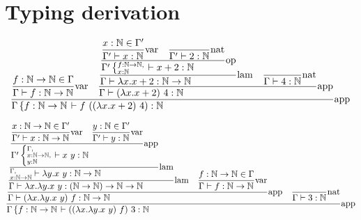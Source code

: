\documentclass{article}
\newcommand{\st}[3][]{\ensuremath{\displaystyle\frac{#3\hfill}{#2\hfill} \text{#1}}}
\newcommand{\N}{\ensuremath \mathbb N}
\newcommand{\lam}[2]{\ensuremath{\lambda#1.#2}}
\begin{document}
\section{Typing derivation}
\begin{equation*}
    \st[app]{
        \Gamma\left\{f:\N\to\N\right. \vdash f\ ((\lam{x}{x+2})\ 4): \N
    }{
        \st[var]{
            \Gamma \vdash f:\N\to\N
        }{
            f:\N\to\N \in \Gamma
        }
        \quad
        \st[app]{
            \Gamma\vdash (\lam{x}{x+2})\ 4: \N
        }{
            \st[lam]{
                \Gamma\vdash \lam{x}{x+2}:\N\to\N
            }{
                \st[op]{
                    \Gamma'\left\{\substack{f:\N\to\N\hfill,\\x:\N\hfill}\right.\vdash x+2:\N
                }{
                    \st[var]{
                        \Gamma'\vdash x:\N
                    }{
                        x:\N\in\Gamma'
                    }
                    \quad
                    \st[nat]{
                        \Gamma'\vdash 2:\N
                    }{
                    }
                }
            }
            \quad
            \st[nat]{
                \Gamma\vdash 4:\N
            }{}
        }
    }
\end{equation*}

\begin{equation*}
    \st[app]{
        \Gamma\left\{f:\N\to\N\right. \vdash ((\lam{x}{\lam{y}{x\ y}})\ f)\ 3:\N
    }{
        \st[app]{
            \Gamma\vdash (\lam{x}{\lam{y}{x\ y}})\ f: \N\to\N
        }{
            \st[lam]{
                \Gamma\vdash \lam{x}{\lam{y}{x\ y}}: (\N\to\N)\to\N\to\N
            }{
                \st[lam]{
                    \substack{\Gamma,\hfill\\x:\N\to\N}\vdash \lam{y}{x\ y}:\N\to\N
                }{
                    \st[app]{
                        \Gamma' \left\{ \substack{\Gamma,\hfill\\x:\N\to\N,\\y:\N\hfill} \right. \vdash x\ y:\N
                    }{
                        \st[var]{
                            \Gamma'\vdash x:\N\to\N
                        }{
                            x:\N\to\N\in\Gamma'
                        }
                        \quad
                        \st[var]{
                            \Gamma'\vdash y:\N
                        }{
                            y:\N\in\Gamma'
                        }
                    }
                }
            }
            \quad
            \st[var]{
                \Gamma\vdash f:\N\to\N
            }{
                f:\N\to\N\in\Gamma
            }
        }
        \quad
        \st[nat]{
            \Gamma\vdash 3:\N
        }{
        }
    }
\end{equation*}
\end{document}
